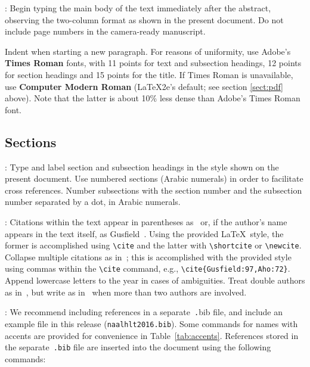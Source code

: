 \documentclass[11pt,letterpaper]{article}
\begin{document}
: Begin typing the main body of the text immediately
after the abstract, observing the two-column format as shown in the present
document. Do not include page numbers in the camera-ready manuscript.  

Indent when starting a new paragraph. For reasons of uniformity,
use Adobe's {\bf Times Roman} fonts, with 11 points for text and 
subsection headings, 12 points for section headings and 15 points for
the title.  If Times Roman is unavailable, use {\bf Computer Modern
  Roman} (\LaTeX2e{}'s default; see section \ref{sect:pdf} above).
Note that the latter is about 10\% less dense than Adobe's Times Roman
font.

\subsection{Sections}

: Type and label section and subsection headings in
the style shown on the present document.  Use numbered sections (Arabic
numerals) in order to facilitate cross references. Number subsections
with the section number and the subsection number separated by a dot,
in Arabic numerals. 

: Citations within the text appear in parentheses
as~\cite{Gusfield:97} or, if the author's name appears in the text itself,
as Gusfield~.  Using the provided \LaTeX\ style, the
former is accomplished using {\small\verb|\cite|} and the latter with
{\small\verb|\shortcite|} or {\small\verb|\newcite|}.  Collapse multiple
citations as in~\cite{Gusfield:97,Aho:72}; this is accomplished with the
provided style using commas within the {\small\verb|\cite|} command, e.g.,
{\small\verb|\cite{Gusfield:97,Aho:72}|}. Append lowercase letters to the
year in cases of ambiguities. Treat double authors as in~\cite{Aho:72}, but
write as in~\cite{Chandra:81} when more than two authors are involved.  

:  We recommend
including references in a separate~{\small\texttt .bib} file, and include
an example file in this release ({\small\tt naalhlt2016.bib}). Some commands
for names with accents are provided for convenience in
Table~\ref{tab:accents}. References stored in the separate~{\small\tt .bib}
file are inserted into the document using the following commands:

\small
\begin{verbatim}


\end{verbatim}
\normalsize 
\end{document}
